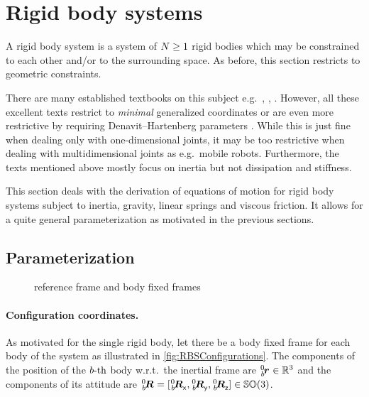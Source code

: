 \section{Rigid body systems}\label{sec:RBSRigidBodySys}
A rigid body system is a system of $N \geq 1$ rigid bodies which may be constrained to each other and/or to the surrounding space.
As before, this section restricts to geometric constraints.

There are many established textbooks on this subject e.g.\ \cite{Schwertassek:MultibodySystems}, \cite{Murray:Robotic}, \cite{Kane:Dynamics}.
However, all these excellent texts restrict to \textit{minimal} generalized coordinates or are even more restrictive by requiring Denavit–Hartenberg parameters \cite{DenavitHartenbergParam}.
While this is just fine when dealing only with one-dimensional joints, it may be too restrictive when dealing with multidimensional joints as e.g.\ mobile robots.
Furthermore, the texts mentioned above mostly focus on inertia but not dissipation and stiffness.

This section deals with the derivation of equations of motion for rigid body systems subject to inertia, gravity, linear springs and viscous friction.
It allows for a quite general parameterization as motivated in the previous sections.

\subsection{Parameterization}\label{sec:RBSParameterization}
\begin{figure}[ht]
 \centering
 
 \caption{reference frame and body fixed frames}
 \label{fig:RBSConfigurations}
\end{figure}

\paragraph{Configuration coordinates.}
As motivated for the single rigid body, let there be a body fixed frame for each body of the system as illustrated in \autoref{fig:RBSConfigurations}.
The components of the position of the $b\text{-th}$ body w.r.t.\ the inertial frame are $\bodyPos{0}{\BidxII} \in \RealNum^3$ and the components of its attitude are $\bodyRot{0}{\BidxII} = [\bodyRotx{0}{\BidxII}, \bodyRoty{0}{\BidxII}, \bodyRotz{0}{\BidxII}] \in \SpecialOrthogonalGroup(3)$.

